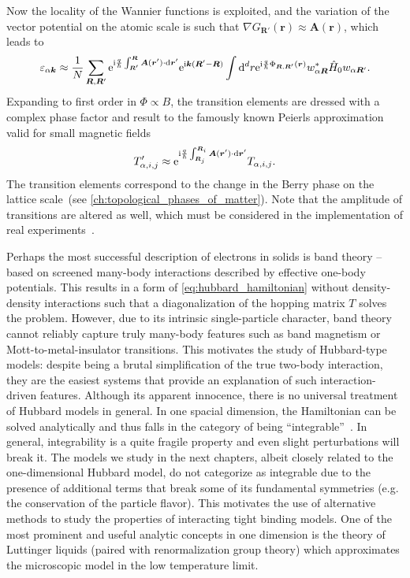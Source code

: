 Now the locality of the Wannier functions is exploited, and the variation of the vector potential on the atomic scale is such that $\nabla G_{\bm R'}(\bm r)\approx\bm A(\bm r)$, which leads to
\begin{align}
    \varepsilon_{\alpha\bm k}
    \approx
    \frac1N\sum_{\bm R,\bm R'}\mathrm e^{\mathrm i\frac q\hbar\int_{\bm R'}^{\bm R}\bm A(\bm r')\cdot\mathrm d \bm r'}\mathrm e^{\mathrm i\bm k(\bm R'-\bm R)}
    \int\mathrm d^d r
        \mathrm e^{\mathrm i\frac q\hbar\Phi_{\bm R,\bm R'}(\bm r)}
        w_{\alpha\bm R}^*
        \hat H_0
        w_{\alpha \bm R'}
    .
\end{align}
Expanding to first order in $\Phi\propto B$, the transition elements are dressed with a complex phase factor and result to the famously known Peierls approximation valid for small magnetic fields
\begin{align}
    T_{\alpha,i,j}'\approx\mathrm e^{\mathrm i\frac q\hbar\int_{\bm R_j}^{\bm R_i}\bm A(\bm r')\cdot\mathrm d\bm r'}T_{\alpha,i,j}.
\end{align}
The transition elements correspond to the change in the Berry phase on the lattice scale~(see \cref{ch:topological_phases_of_matter}).
Note that the amplitude of transitions are altered as well, which must be considered in the implementation of real experiments~\cite{Alexandrov1991}.

Perhaps the most successful description of electrons in solids is band theory -- based on screened many-body interactions described by effective one-body potentials.
This results in a form of \cref{eq:hubbard_hamiltonian} without density-density interactions such that a diagonalization of the hopping matrix $T$ solves the problem.
However, due to its intrinsic single-particle character, band theory cannot reliably capture truly many-body features such as band magnetism or Mott-to-metal-insulator transitions.
This motivates the study of Hubbard-type models: despite being a brutal simplification of the true two-body interaction, they are the easiest systems that provide an explanation of such interaction-driven features.
Although its apparent innocence, there is no universal treatment of Hubbard models in general.
In one spacial dimension, the Hamiltonian can be solved analytically and thus falls in the category of being ``integrable''~\cite{Essler2005}.
In general, integrability is a quite fragile property and even slight perturbations will break it.
The models we study in the next chapters, albeit closely related to the one-dimensional Hubbard model, do not categorize as integrable due to the presence of additional terms that break some of its fundamental symmetries (e.g. the conservation of the particle flavor).
This motivates the use of alternative methods to study the properties of interacting tight binding models.
One of the most prominent and useful analytic concepts in one dimension is the theory of Luttinger liquids (paired with renormalization group theory) which approximates the microscopic model in the low temperature limit.
%
%

